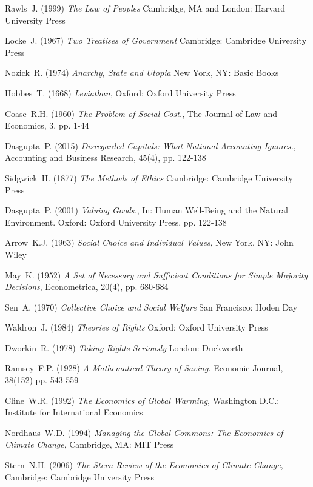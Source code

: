 \documentclass[12pt, oneside]{article}   	%
\begin{document}
\begin{thebibliography}{99}

 Rawls~J. (1999)
\emph{The Law of Peoples}
Cambridge, MA and London: Harvard University Press

 Locke~J. (1967)
\emph{Two Treatises of Government}
Cambridge: Cambridge University Press
	
 Nozick~R. (1974)
\emph{Anarchy, State and Utopia}
New York, NY: Basic Books
	
 Hobbes~T. (1668)
\emph{Leviathan},
Oxford: Oxford University Press

 Coase~R.H. (1960)
\emph{The Problem of Social Cost.},
The Journal of Law and Economics, 3, pp. 1-44

 Dasgupta~P. (2015)
\emph{Disregarded Capitals: What National Accounting Ignores.},
Accounting and Business Research, 45(4), pp. 122-138

 Sidgwick~H. (1877)
\emph{The Methods of Ethics}
Cambridge: Cambridge University Press

 Dasgupta~P. (2001)
\emph{Valuing Goods.},
In: Human Well-Being and the Natural Environment. Oxford: Oxford University Press, pp. 122-138

 Arrow~K.J. (1963)
\emph{Social Choice and Individual Values},
New York, NY: John Wiley
	
 May~K. (1952)
\emph{A Set of Necessary and Sufficient Conditions for Simple Majority Decisions},
Econometrica, 20(4), pp. 680-684

 Sen~A. (1970)
\emph{Collective Choice and Social Welfare}
San Francisco: Hoden Day

 Waldron~J. (1984)
\emph{Theories of Rights}
Oxford: Oxford University Press
		
 Dworkin~R. (1978)
\emph{Taking Rights Seriously}
London: Duckworth

 Ramsey~F.P. (1928)
\emph{A Mathematical Theory of Saving.}
Economic Journal, 38(152) pp. 543-559

 Cline~W.R. (1992)
\emph{The Economics of Global Warming},
Washington D.C.: Institute for International Economics
		
 Nordhaus~W.D. (1994)
\emph{Managing the Global Commons: The Economics of Climate Change},
Cambridge, MA: MIT Press
	
 Stern~N.H. (2006)
\emph{The Stern Review of the Economics of Climate Change},
Cambridge: Cambridge University Press


\end{thebibliography}
\end{document}
